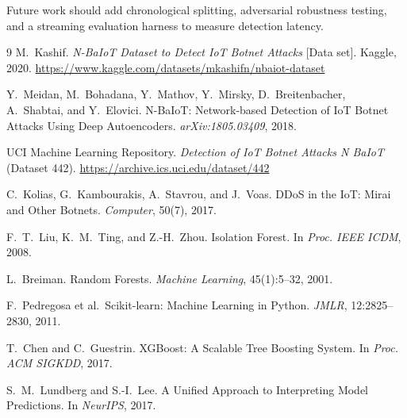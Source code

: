 \documentclass[11pt]{article}
\begin{document}
Future work should add chronological splitting, adversarial robustness
testing, and a streaming evaluation harness to measure detection latency.

\begin{thebibliography}{9}
M.~Kashif. \emph{N-BaIoT Dataset to Detect IoT Botnet Attacks} [Data set].
Kaggle, 2020. \url{https://www.kaggle.com/datasets/mkashifn/nbaiot-dataset}

Y.~Meidan, M.~Bohadana, Y.~Mathov, Y.~Mirsky, D.~Breitenbacher, A.~Shabtai,
and Y.~Elovici. N-BaIoT: Network-based Detection of IoT Botnet Attacks Using
Deep Autoencoders. \emph{arXiv:1805.03409}, 2018.

UCI Machine Learning Repository. \emph{Detection of IoT Botnet Attacks N BaIoT}
(Dataset 442). \url{https://archive.ics.uci.edu/dataset/442}

C.~Kolias, G.~Kambourakis, A.~Stavrou, and J.~Voas. DDoS in the IoT: Mirai
and Other Botnets. \emph{Computer}, 50(7), 2017.

F.~T.~Liu, K.~M.~Ting, and Z.-H.~Zhou. Isolation Forest. In \emph{Proc. IEEE
ICDM}, 2008.

L.~Breiman. Random Forests. \emph{Machine Learning}, 45(1):5--32, 2001.

F.~Pedregosa et al.\ Scikit-learn: Machine Learning in Python. \emph{JMLR},
12:2825--2830, 2011.

T.~Chen and C.~Guestrin. XGBoost: A Scalable Tree Boosting System. In
\emph{Proc. ACM SIGKDD}, 2017.

S.~M.~Lundberg and S.-I.~Lee. A Unified Approach to Interpreting Model
Predictions. In \emph{NeurIPS}, 2017.
\end{thebibliography}
\end{document}
